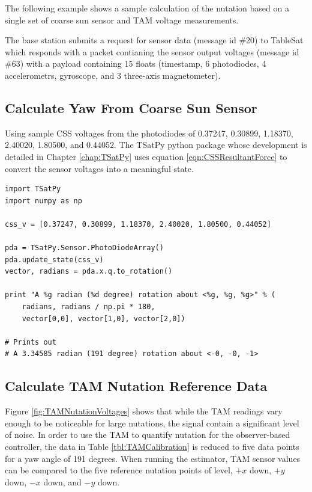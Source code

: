 The following example shows a sample calculation of the nutation based on a single set of coarse sun sensor and TAM voltage measurements.

The base station submits a request for sensor data (message id \#20) to TableSat which responds with a packet contianing the sensor output voltages (message id \#63) with a payload containing 15 floats (timestamp, 6 photodiodes, 4 accelerometrs, gyroscope, and 3 three-axis magnetometer).

\subsection{Calculate Yaw From Coarse Sun Sensor}

Using sample CSS voltages from the photodiodes of 0.37247, 0.30899, 1.18370, 2.40020, 1.80500, and 0.44052.  The TSatPy python package whose development is detailed in Chapter \ref{chap:TSatPy} uses equation \ref{eqn:CSSResultantForce} to convert the sensor voltages into a meaningful state.

\begin{singlespace}
  \begin{verbatim}
import TSatPy
import numpy as np

css_v = [0.37247, 0.30899, 1.18370, 2.40020, 1.80500, 0.44052]

pda = TSatPy.Sensor.PhotoDiodeArray()
pda.update_state(css_v)
vector, radians = pda.x.q.to_rotation()

print "A %g radian (%d degree) rotation about <%g, %g, %g>" % (
    radians, radians / np.pi * 180,
    vector[0,0], vector[1,0], vector[2,0])

# Prints out
# A 3.34585 radian (191 degree) rotation about <-0, -0, -1>
  \end{verbatim}
  \nocite{minted}
\end{singlespace}

\subsection{Calculate TAM Nutation Reference Data}
\label{subsec:CalculateTAMNutationReferenceData}

Figure \ref{fig:TAMNutationVoltages} shows that while the TAM readings vary enough to be noticeable for large nutations, the signal contain a significant level of noise.  In order to use the TAM to quantify nutation for the observer-based controller, the data in Table \ref{tbl:TAMCalibration} is reduced to five data points for a yaw angle of 191 degrees.  When running the estimator, TAM sensor values can be compared to the five reference nutation points of level, $+x$ down, $+y$ down, $-x$ down, and $-y$ down.

